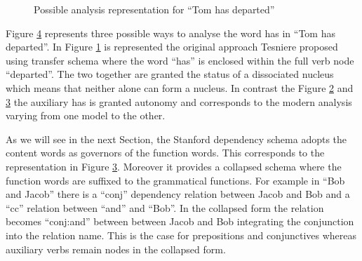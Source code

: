 \begin{figure}[!ht]
    \centering
    \begin{subfigure}{.33\textwidth}
        \centering
        \caption{}
        \label{fig:stemma8-sub1}
    \end{subfigure}%
    \begin{subfigure}{.33\textwidth}
        \centering
        \caption{}
        \label{fig:stemma8-sub2}
    \end{subfigure}
    \begin{subfigure}{.33\textwidth}
        \centering
        \caption{}
        \label{fig:stemma8-sub3}
    \end{subfigure}
    \caption{Possible analysis representation for ``Tom has departed''}
    \label{fig:stemma8}
\end{figure}

Figure \ref{fig:stemma8} represents three possible ways to analyse the word has in ``Tom has departed''. In Figure \ref{fig:stemma8-sub1} is represented the original approach Tesniere proposed using transfer schema where the word ``has'' is enclosed within the full verb node ``departed''. The two together are granted the status of a dissociated nucleus which means that neither alone can form a nucleus. In contrast the Figure \ref{fig:stemma8-sub2} and \ref{fig:stemma8-sub3} the auxiliary has is granted autonomy and corresponds to the modern analysis varying from one model to the other. 

As we will see in the next Section, the Stanford dependency schema \citep{Marneffe2008,Marneffe2008a} adopts the content words as governors of the function words. This corresponds to the representation in Figure \ref{fig:stemma8-sub3}. Moreover it provides a collapsed schema where the function words are suffixed to the grammatical functions. For example in ``Bob and Jacob'' there is a ``conj'' dependency relation between Jacob and Bob and a ``cc'' relation between ``and'' and ``Bob''. In the collapsed form the relation becomes ``conj:and'' between between Jacob and Bob integrating the conjunction into the relation name. This is the case for prepositions and conjunctives whereas auxiliary verbs remain nodes in the collapsed form. 

